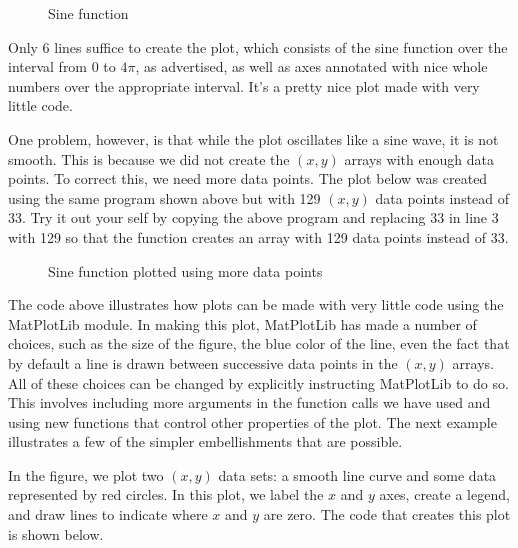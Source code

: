 \documentclass[letterpaper,10pt,english]{sphinxmanual}
\begin{document}
\begin{figure}[htbp]
\centering
\capstart

\noindent{}
\caption{Sine function}\label{\detokenize{chap5/chap5_plot:id2}}\label{\detokenize{chap5/chap5_plot:fig-sineplot}}\end{figure}

\sphinxAtStartPar
Only 6 lines suffice to create the plot, which consists of the sine function over the interval from 0 to \(4\pi\), as advertised, as well as axes annotated with nice whole numbers over the appropriate interval.  It’s a pretty nice plot made with very little code.

\sphinxAtStartPar
One problem, however, is that while the plot oscillates like a sine wave, it is not smooth.  This is because we did not create the \((x,y)\) arrays with enough data points.  To correct this, we need more data points.  The plot below was created using the same program shown above but with 129 \((x,y)\) data points instead of 33.  Try it out your self by copying the above program and replacing 33 in line 3 with 129 so that the function  creates an array with 129 data points instead of 33.

\begin{figure}[htbp]
\centering
\capstart

\noindent{}
\caption{Sine function plotted using more data points}\label{\detokenize{chap5/chap5_plot:id3}}\label{\detokenize{chap5/chap5_plot:fig-sineplotdenserxy}}\end{figure}

\sphinxAtStartPar
The code above illustrates how plots can be made with very little code using the MatPlotLib module.  In making this plot, MatPlotLib has made a number of choices, such as the size of the figure, the blue color of the line, even the fact that by default a line is drawn between successive data points in the \((x,y)\) arrays.  All of these choices can be changed by explicitly instructing MatPlotLib to do so.  This involves including more arguments in the function calls we have used and using new functions that control other properties of the plot.  The next example illustrates a few of the simpler embellishments that are possible.

\sphinxAtStartPar
In the {\hyperref[\detokenize{chap5/chap5_plot:fig-wavypulse}]{}} figure, we plot two \((x,y)\) data sets: a smooth line curve and some data represented by red circles.  In this plot, we label the \(x\) and \(y\) axes, create a legend, and draw lines to indicate where \(x\) and \(y\) are zero.  The code that creates this plot is shown below.
\end{document}
